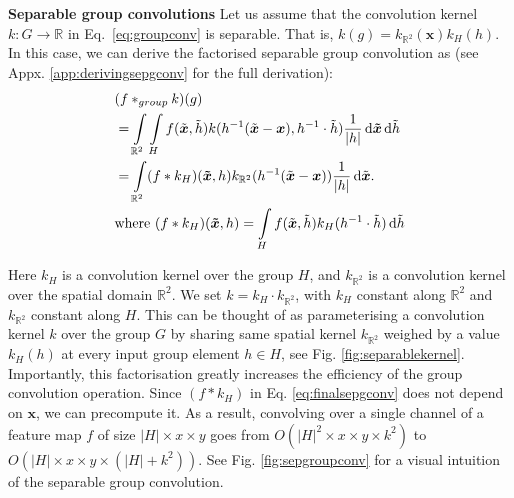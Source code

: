 \documentclass[nohyperref]{article}
\theoremstyle{plain}
\theoremstyle{definition}
\theoremstyle{remark}
\newcommand{\R}{\mathbb{R}}
\begin{document}
\textbf{Separable group convolutions} \label{sec:seperablegroupconvs} Let us assume that the convolution kernel $k:G\rightarrow \R$ in Eq.~\ref{eq:groupconv} is separable. That is, $k(g) {=} k_{\mathbb{R}^2}(\boldsymbol{x})  k_H(h)$.  In this case, we can derive the factorised separable group convolution as (see Appx. \ref{app:derivingsepgconv} for the full derivation):
\begin{align}
    &(f *_{group} k)(g) \\&= \int\limits_{\R^2}\int\limits_H f(\tilde{\boldsymbol{x}},\tilde{h})k({h^{-1}}(\tilde{\boldsymbol{x}}-\boldsymbol{x}), h^{-1}\cdot \tilde{h})\dfrac{1}{|h|} \,{\rm d}\boldsymbol{\tilde{x}}\,{\rm d}\tilde{h} \nonumber\\
    &= \int\limits_{\R^2} (f * k_H)(\boldsymbol{\tilde{x}}, h)k_{\R^2}({h^{-1}}(\tilde{\boldsymbol{x}}-\boldsymbol{x})) \frac{1}{|h|}\,{\rm d}\tilde{\boldsymbol{x}}. \label{eq:finalsepgconv} \\
    &\text{where } (f * k_H)(\boldsymbol{\tilde{x}}, h) = \int\limits_Hf(\tilde{\boldsymbol{x}},\tilde{h})k_H (h^{-1}\cdot \tilde{h})\,{\rm d}\tilde{h} \nonumber
\end{align}

Here $k_H$ is a convolution kernel over the group $H$, and $k_{\mathbb{R}^2}$ is a convolution kernel over the spatial domain $\mathbb{R}^2$. We set $k {=} k_H \cdot k_{\mathbb{R}^2}$, with $k_H$ constant along $\R^2$ and $k_{\mathbb{R}^2}$ constant along $H$. This can be thought of as parameterising a convolution kernel $k$ over the group $G$ by sharing same spatial kernel $k_{\R^2}$ weighed by a value $k_H(h)$ at every input group element $h \in H$, see Fig. \ref{fig:separablekernel}. Importantly, this factorisation greatly increases the efficiency of the group convolution operation. Since $(f * k_H)$ in Eq. \ref{eq:finalsepgconv} does not depend on $\boldsymbol{x}$, we can precompute it. As a result, convolving over a single channel of a feature map $f$ of size $|H| {\times} x {\times} y$ goes from $O(|H|^2 {\times} x {\times} y {\times} k^2)$ to $O(|H| {\times} x {\times} y {\times} (|H| + k^2))$. See Fig. \ref{fig:sepgroupconv} for a visual intuition of the separable group convolution.
\end{document}
